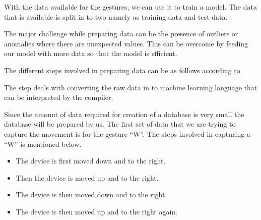 
With the data available for the gestures, we can use it to train a model. The data that is available is split in to two namely as training data and test data.

The major challenge while preparing data can be the presence of outliers or anomalies where there are unexpected values. This can be overcome by feeding our model with more data so that the model is efficient. \cite{Warden:2020}

The different steps involved in preparing data can be as follows according to \cite{Warden:2020}


The step deals with converting the raw data in to machine learning language that can be interpreted by the compiler. 
 


Since the amount of data required for creation of a database is very small the database will be prepared by us. The first set of data that we are trying to capture the movement is for the gesture ``W''. The steps involved in capturing a ``W'' is mentioned below. \cite{Warden:2020}

\begin{center}
\end{center}


\begin{itemize}
    
    \item The device is first moved down and to the right.
    \item Then the device is moved up and to the right.
    \item The device is then moved down and to the right.
    \item  The device is then moved up and to the right again. 
    
\end{itemize}

